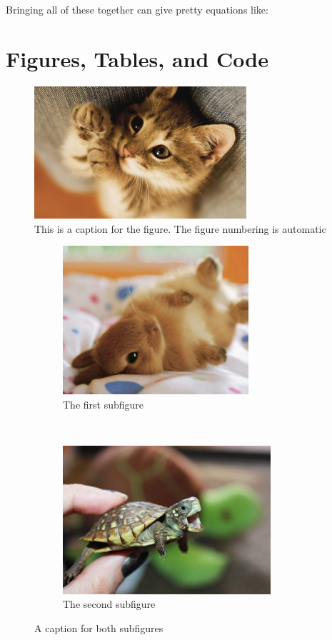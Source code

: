 \documentclass{article}
\begin{document}
Bringing all of these together can give pretty equations like:

\section{Figures, Tables, and Code}

\begin{figure}[h!]
    \centering
    \includegraphics[width=0.7\textwidth]{cat.jpg}
    \caption{This is a caption for the figure. The figure numbering is automatic}
\end{figure}

\begin{figure}[h!]
    \centering
    \begin{subfigure}{0.47\textwidth}
        \includegraphics[height=5.5cm]{rabbit.jpg}
        \caption{The first subfigure}
    \end{subfigure}
    ~
    \begin{subfigure}{0.47\textwidth}
        \includegraphics[height=5.5cm]{turtle.jpg}
        \caption{The second subfigure}
    \end{subfigure}
    \caption{A caption for both subfigures}
\end{figure}
\end{document}
